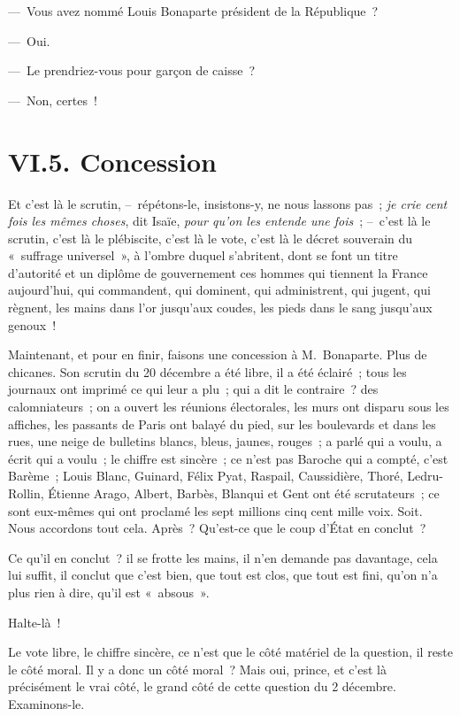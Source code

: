 \documentclass[french,twoside]{book} %
\begin{document}
— Vous avez nommé Louis Bonaparte président de la République ?\par
— Oui.\par
— Le prendriez-vous pour garçon de caisse ?\par
— Non, certes !

\section[{VI.5. Concession}]{VI.5. Concession}

\noindent Et c’est là le scrutin, – répétons-le, insistons-y, ne nous lassons pas ; \emph{je crie cent fois les mêmes choses}, dit Isaïe, \emph{pour qu’on les entende une fois} ; – c’est là le scrutin, c’est là le plébiscite, c’est là le vote, c’est là le décret souverain du « suffrage universel », à l’ombre duquel s’abritent, dont se font un titre d’autorité et un diplôme de gouvernement ces hommes qui tiennent la France aujourd’hui, qui commandent, qui dominent, qui administrent, qui jugent, qui règnent, les mains dans l’or jusqu’aux coudes, les pieds dans le sang jusqu’aux genoux !\par
Maintenant, et pour en finir, faisons une concession à M. Bonaparte. Plus de chicanes. Son scrutin du 20 décembre a été libre, il a été éclairé ; tous les journaux ont imprimé ce qui leur a plu ; qui a dit le contraire ? des calomniateurs ; on a ouvert les réunions électorales, les murs ont disparu sous les affiches, les passants de Paris ont balayé du pied, sur les boulevards et dans les rues, une neige de bulletins blancs, bleus, jaunes, rouges ; a parlé qui a voulu, a écrit qui a voulu ; le chiffre est sincère ; ce n’est pas Baroche qui a compté, c’est Barème ; Louis Blanc, Guinard, Félix Pyat, Raspail, Caussidière, Thoré, Ledru-Rollin, Étienne Arago, Albert, Barbès, Blanqui et Gent ont été scrutateurs ; ce sont eux-mêmes qui ont proclamé les sept millions cinq cent mille voix. Soit. Nous accordons tout cela. Après ? Qu’est-ce que le coup d’État en conclut ?\par
Ce qu’il en conclut ? il se frotte les mains, il n’en demande pas davantage, cela lui suffit, il conclut que c’est bien, que tout est clos, que tout est fini, qu’on n’a plus rien à dire, qu’il est « absous ».\par
Halte-là !\par
Le vote libre, le chiffre sincère, ce n’est que le côté matériel de la question, il reste le côté moral. Il y a donc un côté moral ? Mais oui, prince, et c’est là précisément le vrai côté, le grand côté de cette question du 2 décembre. Examinons-le.
\end{document}

